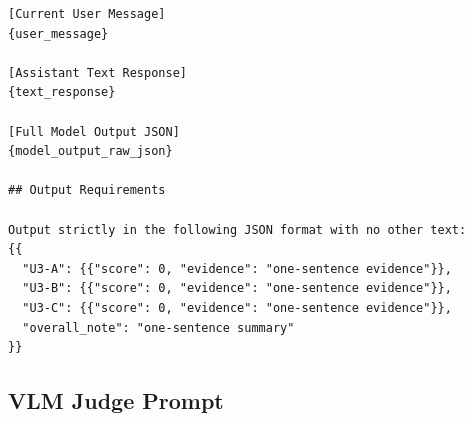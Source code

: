 \begin{verbatim}
[Current User Message]
{user_message}

[Assistant Text Response]
{text_response}

[Full Model Output JSON]
{model_output_raw_json}

## Output Requirements

Output strictly in the following JSON format with no other text:
{{
  "U3-A": {{"score": 0, "evidence": "one-sentence evidence"}},
  "U3-B": {{"score": 0, "evidence": "one-sentence evidence"}},
  "U3-C": {{"score": 0, "evidence": "one-sentence evidence"}},
  "overall_note": "one-sentence summary"
}}
\end{verbatim}

\subsection{VLM Judge Prompt}
\label{app:a2ui-vlm-judge-prompt}

